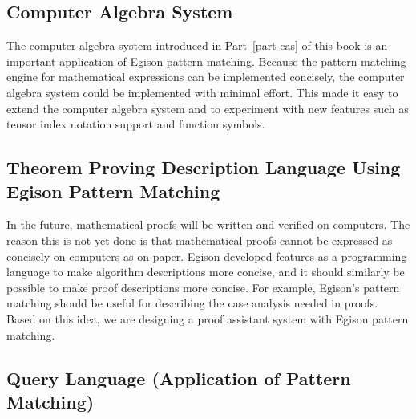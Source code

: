 \subsection{Computer Algebra System}

The computer algebra system introduced in Part~\ref{part-cas} of this book is an important application of Egison pattern matching.
Because the pattern matching engine for mathematical expressions can be implemented concisely, the computer algebra system could be implemented with minimal effort.
This made it easy to extend the computer algebra system and to experiment with new features such as tensor index notation support and function symbols.

\subsection{Theorem Proving Description Language Using Egison Pattern Matching}

In the future, mathematical proofs will be written and verified on computers.
The reason this is not yet done is that mathematical proofs cannot be expressed as concisely on computers as on paper.
Egison developed features as a programming language to make algorithm descriptions more concise, and it should similarly be possible to make proof descriptions more concise.
For example, Egison's pattern matching should be useful for describing the case analysis needed in proofs.
Based on this idea, we are designing a proof assistant system with Egison pattern matching\cite{egi2020pattern}.

\subsection{Query Language (Application of Pattern Matching)}

